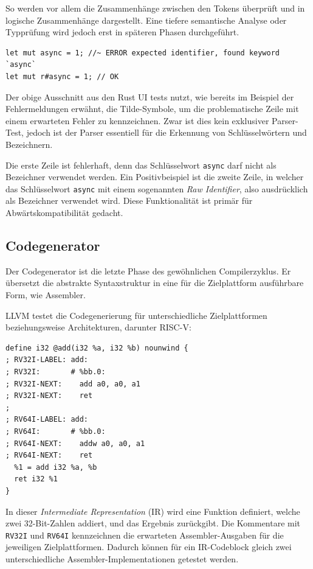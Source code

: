 \documentclass[a4paper,11pt]{article}
\begin{document}
So werden vor allem die Zusammenhänge zwischen den Tokens überprüft und in logische Zusammenhänge dargestellt. Eine tiefere semantische Analyse oder Typprüfung wird jedoch erst in späteren Phasen durchgeführt. \parencite{ibm_compiler_phases}

\begin{verbatim}
let mut async = 1; //~ ERROR expected identifier, found keyword `async`
let mut r#async = 1; // OK
\end{verbatim}

Der obige Ausschnitt \parencite{rust_parsing_keywords} aus den Rust UI tests \parencite{rust_ui_tests} nutzt, wie bereits im Beispiel der Fehlermeldungen erwähnt, die Tilde-Symbole, um die problematische Zeile mit einem erwarteten Fehler zu kennzeichnen. Zwar ist dies kein exklusiver Parser-Test, jedoch ist der Parser essentiell für die Erkennung von Schlüsselwörtern und Bezeichnern. 

Die erste Zeile ist fehlerhaft, denn das Schlüsselwort \texttt{async} darf nicht als Bezeichner verwendet werden. Ein Positivbeispiel ist die zweite Zeile, in welcher das Schlüsselwort \texttt{async} mit einem sogenannten \emph{Raw Identifier}, also ausdrücklich als Bezeichner verwendet wird. Diese Funktionalität ist primär für Abwärtskompatibilität gedacht.

\subsection{Codegenerator}

Der Codegenerator ist die letzte Phase des gewöhnlichen Compilerzyklus. Er übersetzt die abstrakte Syntaxstruktur in eine für die Zielplattform ausführbare Form, wie Assembler.

LLVM testet die Codegenerierung für unterschiedliche Zielplattformen beziehungsweise Architekturen, darunter RISC-V: \parencite{llvm_alu32}

\begin{verbatim}
define i32 @add(i32 %a, i32 %b) nounwind {
; RV32I-LABEL: add:
; RV32I:       # %bb.0:
; RV32I-NEXT:    add a0, a0, a1
; RV32I-NEXT:    ret
;
; RV64I-LABEL: add:
; RV64I:       # %bb.0:
; RV64I-NEXT:    addw a0, a0, a1
; RV64I-NEXT:    ret
  %1 = add i32 %a, %b
  ret i32 %1
}
\end{verbatim}

In dieser \emph{Intermediate Representation} (IR) wird eine Funktion definiert, welche zwei 32-Bit-Zahlen addiert, und das Ergebnis zurückgibt. Die Kommentare mit \texttt{RV32I} und \texttt{RV64I} kennzeichnen die erwarteten Assembler-Ausgaben für die jeweiligen Zielplattformen. Dadurch können für ein IR-Codeblock gleich zwei unterschiedliche Assembler-Implementationen getestet werden.
\end{document}
